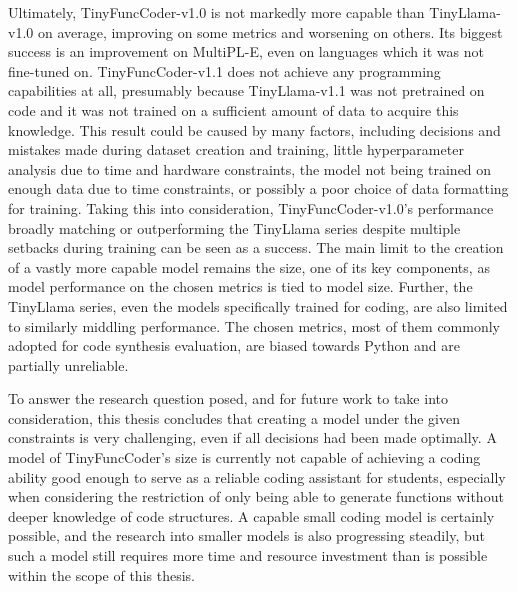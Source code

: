 Ultimately, TinyFuncCoder-v1.0 is not markedly more capable than TinyLlama-v1.0 on average, improving on some metrics and worsening on others.
Its biggest success is an improvement on MultiPL-E, even on languages which it was not fine-tuned on.
TinyFuncCoder-v1.1 does not achieve any programming capabilities at all, presumably because TinyLlama-v1.1 was not pretrained on code and it was not trained on a sufficient amount of data to acquire this knowledge.
This result could be caused by many factors, including decisions and mistakes made during dataset creation and training, little hyperparameter analysis due to time and hardware constraints, the model not being trained on enough data due to time constraints, or possibly a poor choice of data formatting for training.
Taking this into consideration, TinyFuncCoder-v1.0's performance broadly matching or outperforming the TinyLlama series despite multiple setbacks during training can be seen as a success.
The main limit to the creation of a vastly more capable model remains the size, one of its key components, as model performance on the chosen metrics is tied to model size.
Further, the TinyLlama series, even the models specifically trained for coding, are also limited to similarly middling performance.
The chosen metrics, most of them commonly adopted for code synthesis evaluation, are biased towards Python and are partially unreliable.

To answer the research question posed, and for future work to take into consideration, this thesis concludes that creating a model under the given constraints is very challenging, even if all decisions had been made optimally.
A model of TinyFuncCoder's size is currently not capable of achieving a coding ability good enough to serve as a reliable coding assistant for students, especially when considering the restriction of only being able to generate functions without deeper knowledge of code structures.
A capable small coding model is certainly possible, and the research into smaller models is also progressing steadily, but such a model still requires more time and resource investment than is possible within the scope of this thesis.